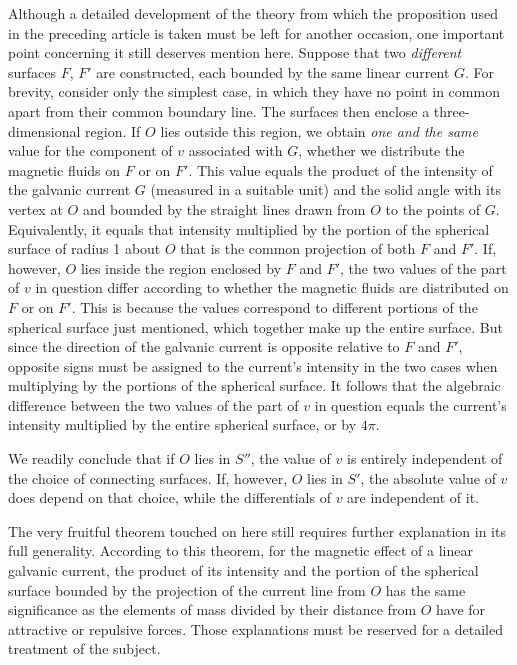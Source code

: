 Although a detailed development of the theory from which the proposition used in the preceding article is taken must be left for another occasion, one important point concerning it still deserves mention here. Suppose that two \textit{different} surfaces $F$, $F'$ are constructed, each bounded by the same linear current $G$. For brevity, consider only the simplest case, in which they have no point in common apart from their common boundary line. The surfaces then enclose a three-dimensional region. If $O$ lies outside this region, we obtain \textit{one and the same} value for the component of $v$ associated with $G$, whether we distribute the magnetic fluids on $F$ or on $F'$. This value equals the product of the intensity of the galvanic current $G$ (measured in a suitable unit) and the solid angle with its vertex at $O$ and bounded by the straight lines drawn from $O$ to the points of $G$. Equivalently, it equals that intensity multiplied by the portion of the spherical surface of radius 1 about $O$ that is the common projection of both $F$ and $F'$. If, however, $O$ lies inside the region enclosed by $F$ and $F'$, the two values of the part of $v$ in question differ according to whether the magnetic fluids are distributed on $F$ or on $F'$. This is because the values correspond to different portions of the spherical surface just mentioned, which together make up the entire surface. But since the direction of the galvanic current is opposite relative to $F$ and $F'$, opposite signs must be assigned to the current's intensity in the two cases when multiplying by the portions of the spherical surface. It follows that the algebraic difference between the two values
of the part of $v$ in question equals the current's intensity multiplied by the entire spherical surface, or by $4\pi$.

We readily conclude that if $O$ lies in $S''$, the value of $v$ is entirely independent of the choice of connecting surfaces. If, however, $O$ lies in $S'$, the absolute value of $v$ does depend on that choice, while the differentials of $v$ are independent of it.

The very fruitful theorem touched on here still requires further explanation in its full generality. According to this theorem, for the magnetic effect of a linear galvanic current, the product of its intensity and the portion of the spherical surface bounded by the projection of the current line from $O$ has the same significance as the elements of mass divided by their distance from $O$ have for attractive or repulsive forces. Those explanations must be reserved for a detailed treatment of the subject.

